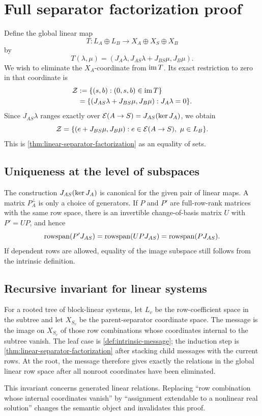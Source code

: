 \section{Full separator factorization proof}
\label{app:separator}

Define the global linear map
\begin{equation}
 T:L_A\oplus L_B\to X_A\oplus X_S\oplus X_B
\end{equation}
by
\begin{equation}
 T(\lambda,\mu)=
 (J_A\lambda,J_{AS}\lambda+J_{BS}\mu,J_B\mu).
\end{equation}
We wish to eliminate the \(X_A\)-coordinate from \(\operatorname{im} T\).  Its exact
restriction to zero in that coordinate is
\begin{align}
 \mathcal Z
 &:={\{(s,b): (0,s,b)\in\operatorname{im} T\}}\\
 &=\{(J_{AS}\lambda+J_{BS}\mu,J_B\mu):
        J_A\lambda=0\}.
 \label{eq:restricted-global-image}
\end{align}
Since \(J_{AS}\lambda\) ranges exactly over
\(\mathcal{E}(A\to S)=J_{AS}(\operatorname{ker} J_A)\), we obtain
\begin{equation}
 \mathcal Z=
 \{(e+J_{BS}\mu,J_B\mu):e\in\mathcal{E}(A\to S),\ \mu\in L_B\}.
\end{equation}
This is \cref{thm:linear-separator-factorization} as an equality of sets.

\subsection{Uniqueness at the level of subspaces}

The construction \(J_{AS}(\operatorname{ker} J_A)\) is canonical for the given pair of
linear maps.  A matrix \(P_A^\perp\) is only a choice of generators.  If
\(P\) and \(P'\) are full-row-rank matrices with the same row space, there is an
invertible change-of-basis matrix \(U\) with \(P'=UP\), and hence
\begin{equation}
 \operatorname{rowspan}(P'J_{AS})=\operatorname{rowspan}(UPJ_{AS})=\operatorname{rowspan}(PJ_{AS}).
\end{equation}
If dependent rows are allowed, equality of the image subspace still follows
from the intrinsic definition.

\subsection{Recursive invariant for linear systems}

For a rooted tree of block-linear systems, let \(L_v\) be the row-coefficient
space in the subtree and let \(X_{S_v}\) be the parent-separator coordinate
space.  The message is the image on \(X_{S_v}\) of those row combinations whose
coordinates internal to the subtree vanish.  The leaf case is
\cref{def:intrinsic-message}; the induction step is
\cref{thm:linear-separator-factorization} after stacking child messages with
the current rows.  At the root, the message therefore gives exactly the
relations in the global linear row space after all nonroot coordinates have
been eliminated.

This invariant concerns generated linear relations.  Replacing ``row
combination whose internal coordinates vanish'' by ``assignment extendable to
a nonlinear real solution'' changes the semantic object and invalidates this
proof.
